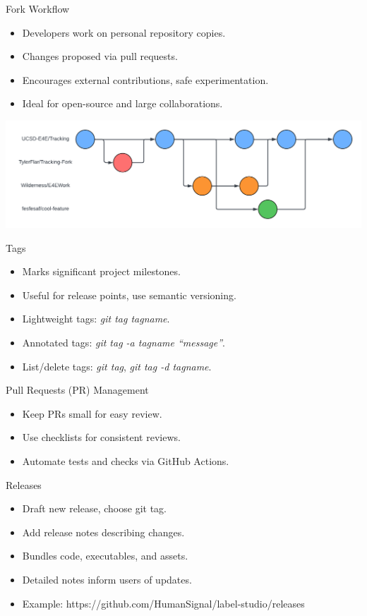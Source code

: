 \documentclass[aspectratio=169]{beamer}
\begin{document}
\begin{frame}{Fork Workflow}
    \begin{itemize}
        \item Developers work on personal repository copies.
        \item Changes proposed via pull requests.
        \item Encourages external contributions, safe experimentation.
        \item Ideal for open-source and large collaborations.
    \end{itemize}
    \begin{center}
        \includegraphics[scale=.25]{fork_workflow_diagram.png}
    \end{center}
\end{frame}
\begin{frame}{Tags}
    \begin{itemize}
        \item Marks significant project milestones.
        \item Useful for release points, use semantic versioning.
        \item Lightweight tags: \textit{git tag tagname}.
        \item Annotated tags: \textit{git tag -a tagname ``message''}.
        \item List/delete tags: \textit{git tag}, \textit{git tag -d tagname}.
    \end{itemize}
\end{frame}    
\begin{frame}{Pull Requests (PR) Management}
    \begin{itemize}
        \item Keep PRs small for easy review.
        \item Use checklists for consistent reviews.
        \item Automate tests and checks via GitHub Actions.
    \end{itemize}
\end{frame}
\begin{frame}{Releases}
    \begin{itemize}
        \item Draft new release, choose git tag.
        \item Add release notes describing changes.
        \item Bundles code, executables, and assets.
        \item Detailed notes inform users of updates.
        \item Example: https://github.com/HumanSignal/label-studio/releases
    \end{itemize}
\end{frame}
\end{document}
